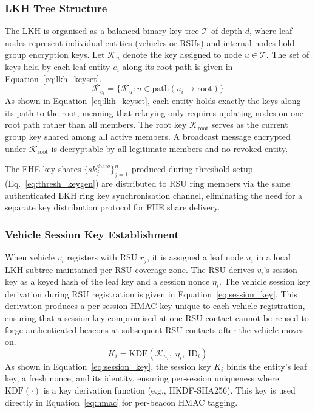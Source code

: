 \documentclass[12pt, a4paper]{report}
\begin{document}
\subsubsection{LKH Tree Structure}

The LKH is organised as a balanced binary key tree $\mathcal{T}$ of
depth $d$, where leaf nodes represent individual entities (vehicles or
RSUs) and internal nodes hold group encryption keys. Let
$\mathcal{K}_u$ denote the key assigned to node $u \in \mathcal{T}$.
The set of keys held by each leaf entity $e_i$ along its root path
is given in Equation~\ref{eq:lkh_keyset}.
\begin{equation}
  \mathcal{K}_{e_i} = \{\mathcal{K}_{u} :
    u \in \mathrm{path}(u_i \to \mathrm{root})\}
  \label{eq:lkh_keyset}
\end{equation}
As shown in Equation~\ref{eq:lkh_keyset}, each entity holds exactly
the keys along its path to the root, meaning that rekeying only
requires updating nodes on one root path rather than all members.
The root key $\mathcal{K}_{\mathrm{root}}$ serves as the current group
key shared among all active members. A broadcast message encrypted
under $\mathcal{K}_{\mathrm{root}}$ is decryptable by all legitimate
members and no revoked entity.

The FHE key shares $\{sk_j^{\mathrm{share}}\}_{j=1}^{n}$ produced
during threshold setup (Eq.~\eqref{eq:thresh_keygen}) are distributed
to RSU ring members via the same authenticated LKH ring key
synchronisation channel, eliminating the need for a separate key
distribution protocol for FHE share delivery.

\subsubsection{Vehicle Session Key Establishment}

When vehicle $v_i$ registers with RSU $r_j$, it is assigned a leaf
node $u_i$ in a local LKH subtree maintained per RSU coverage zone.
The RSU derives $v_i$'s session key as a keyed hash of the leaf key
and a session nonce $\eta_i$. The vehicle session key derivation during
RSU registration is given in Equation~\ref{eq:session_key}.
\newline
\newline
This derivation produces a per-session HMAC key unique to each
vehicle registration, ensuring that a session key compromised at one
RSU contact cannot be reused to forge authenticated beacons at
subsequent RSU contacts after the vehicle moves on.
\begin{equation}
  K_i = \mathrm{KDF}(\mathcal{K}_{u_i},\; \eta_i,\; \mathrm{ID}_i)
  \label{eq:session_key}
\end{equation}
As shown in Equation~\ref{eq:session_key}, the session
key $K_i$ binds the entity's leaf key, a fresh nonce, and its identity,
ensuring per-session uniqueness where $\mathrm{KDF}(\cdot)$ is a key derivation function (e.g.,
HKDF-SHA256). This key is used directly in
Equation~\ref{eq:hmac} for per-beacon HMAC tagging.
\end{document}
